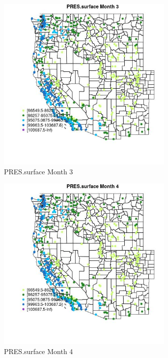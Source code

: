 \begin{figure} 
\centering  
\includegraphics[width=0.77\textwidth]{Code_Outputs/Report_ML_input_PM25_Step4_part_e_de_duplicated_aves_compiled_2019-05-14wNAs_MapObsMo3PRESsurface.jpg} 
\caption{\label{fig:Report_ML_input_PM25_Step4_part_e_de_duplicated_aves_compiled_2019-05-14wNAsMapObsMo3PRESsurface}PRES.surface Month 3} 
\end{figure} 
 

\begin{figure} 
\centering  
\includegraphics[width=0.77\textwidth]{Code_Outputs/Report_ML_input_PM25_Step4_part_e_de_duplicated_aves_compiled_2019-05-14wNAs_MapObsMo4PRESsurface.jpg} 
\caption{\label{fig:Report_ML_input_PM25_Step4_part_e_de_duplicated_aves_compiled_2019-05-14wNAsMapObsMo4PRESsurface}PRES.surface Month 4} 
\end{figure} 
 

